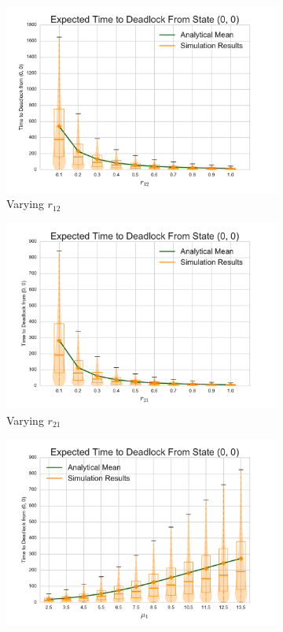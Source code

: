 \documentclass{article}
\begin{document}
\begin{center}
\begin{figure}[!htbp]
\begin{center}
\begin{subfigure}[b]{0.38\textwidth}
  \includegraphics[width=\textwidth]{images/varyr12}
  \caption{Varying $r_{12}$}
  \label{fig:timestodeadlock2_r12}
\end{subfigure}
\begin{subfigure}[b]{0.38\textwidth}
  \includegraphics[width=\textwidth]{images/varyr21}
  \caption{Varying $r_{21}$}
  \label{fig:timestodeadlock2_r21}
\end{subfigure}
\begin{subfigure}[b]{0.38\textwidth}
  \includegraphics[width=\textwidth]{images/varymu1}

\end{subfigure}
\end{center}
\end{figure}
\end{center}
\end{document}
